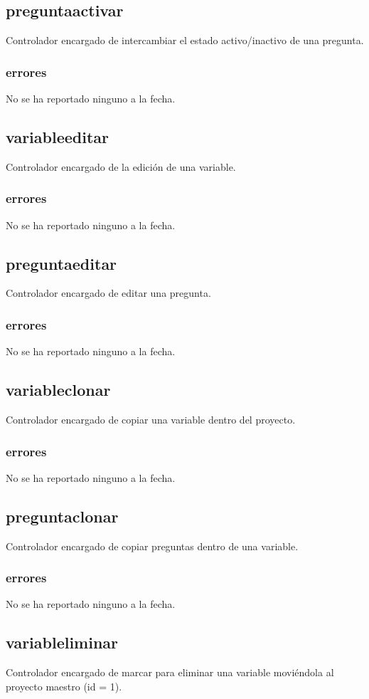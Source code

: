 \documentclass[10pt,a4paper]{book}
\begin{document}
	\subsection{preguntaactivar}
	Controlador encargado de intercambiar el estado activo/inactivo de una pregunta.
	\subsubsection{errores}
	No se ha reportado ninguno a la fecha.
	
	\subsection{variableeditar}
	Controlador encargado de la edición de una variable.
	\subsubsection{errores}
	No se ha reportado ninguno a la fecha.
	
	\subsection{preguntaeditar}
	Controlador encargado de editar una pregunta.
	\subsubsection{errores}
	No se ha reportado ninguno a la fecha.
	
	\subsection{variableclonar}
	Controlador encargado de copiar una variable dentro del proyecto.
	\subsubsection{errores}
	No se ha reportado ninguno a la fecha.
	
	\subsection{preguntaclonar}
	Controlador encargado de copiar preguntas dentro de una variable.
	\subsubsection{errores}
	No se ha reportado ninguno a la fecha.
	
	\subsection{variableliminar}
	Controlador encargado de marcar para eliminar una variable moviéndola al proyecto maestro (id = 1).
\end{document}
